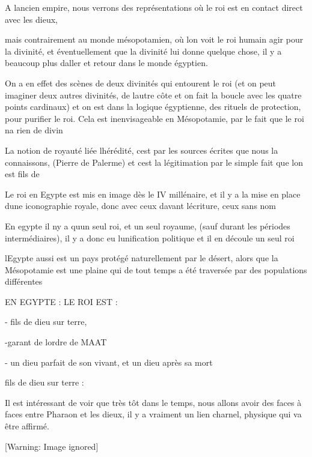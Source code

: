 \documentclass{article}
\begin{document}
A l{\textquotesingle}ancien empire, nous verrons des représentations où
le roi est en contact direct avec les dieux, 

mais contrairement au monde mésopotamien, où l{\textquotesingle}on voit
le roi humain agir pour la divinité, et éventuellement que la divinité
lui donne quelque chose, il y a beaucoup plus d{\textquotesingle}aller
et retour dans le monde égyptien.

On a en effet des scènes de deux divinités qui entourent le roi (et on
peut imaginer deux autres divinités, de l{\textquotesingle}autre côte
et on fait la boucle avec les quatre points cardinaux) et on est dans
la logique égyptienne, des rituels de protection, pour purifier le roi.
Cela est inenvisageable en Mésopotamie, par le fait que le roi
n{\textquotesingle}a rien de divin

La notion de royauté liée  l{\textquotesingle}hérédité,
c{\textquotesingle}est par les sources écrites que nous la connaissons,
(Pierre de Palerme) et c{\textquotesingle}est la légitimation par le
simple fait que l{\textquotesingle}on est fils de 

Le roi en Egypte est mis en image dès le IV millénaire, et il y a la
mise en place d{\textquotesingle}une iconographie royale, donc avec
ceux d{\textquotesingle}avant l{\textquotesingle}écriture, ceux sans
nom

En egypte  il n{\textquotesingle}y a qu{\textquotesingle}un seul roi, et
un seul royaume, (sauf durant les périodes intermédiaires), il y a donc
eu l{\textquotesingle}unification politique et il en découle un seul
roi

l{\textquotesingle}Egypte aussi est un pays protégé naturellement par le
désert, alors que la Mésopotamie est une plaine qui de tout temps a été
traversée par des populations différentes

EN EGYPTE : LE ROI EST :

{}- fils de dieu sur terre,

{}-garant de l{\textquotesingle}ordre de MAAT

{}- un dieu parfait de son vivant, et un dieu après sa mort

fils de dieu sur terre : 

Il est intéressant de voir que très tôt dans le temps, nous allons avoir
des faces à faces entre Pharaon et les dieux, il y a vraiment un lien
charnel, physique qui va être affirmé.

  [Warning: Image ignored] %
 
\end{document}
